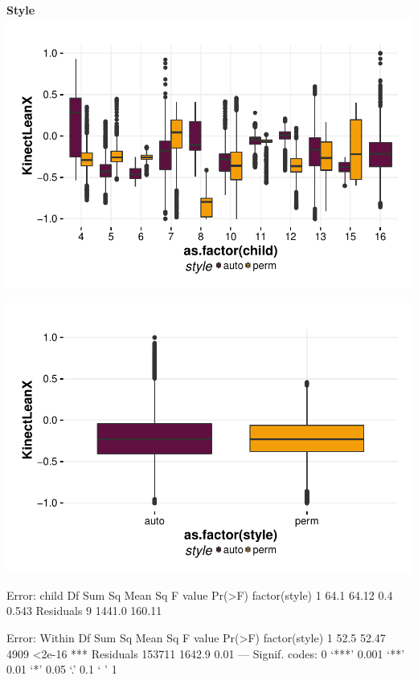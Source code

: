 \documentclass{article}
\begin{document}
\textbf{Style}
\includegraphics{features-plot_leanx_child_style_quiz}

\includegraphics{features-plot_leanx_style_quiz}

\begin{Schunk}
\begin{Soutput}
Error: child
              Df Sum Sq Mean Sq F value Pr(>F)
factor(style)  1   64.1   64.12     0.4  0.543
Residuals      9 1441.0  160.11               

Error: Within
                  Df Sum Sq Mean Sq F value Pr(>F)    
factor(style)      1   52.5   52.47    4909 <2e-16 ***
Residuals     153711 1642.9    0.01                   
---
Signif. codes:  0 ‘***’ 0.001 ‘**’ 0.01 ‘*’ 0.05 ‘.’ 0.1 ‘ ’ 1
\end{Soutput}
\end{Schunk}
\end{document}
